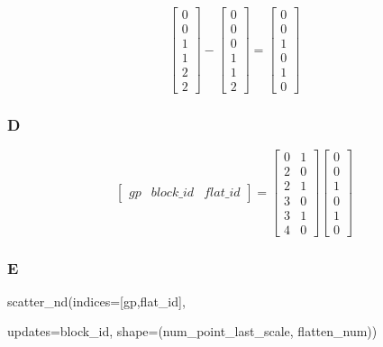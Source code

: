 \documentclass[,table,dvipsnames]{article}
\begin{document}
\[ 
\begin{bmatrix}
0 \\ 0 \\ 1 \\ 1 \\ 2 \\ 2 
\end{bmatrix}
-
\begin{bmatrix}
0 \\ 0 \\ 0 \\ 1 \\ 1 \\2 
\end{bmatrix}
=
\begin{bmatrix}
0 \\ 0 \\ 1 \\ 0 \\ 1 \\0
\end{bmatrix}
\]

\subsubsection{D}
\[ 
\begin{bmatrix}
gp & block\_id & flat\_id
\end{bmatrix}
=
\begin{bmatrix}
	0 & 1 \\ 2 & 0 \\  2 & 1 \\ 3 & 0\\ 3 & 1\\ 4 & 0 
\end{bmatrix} 
\begin{bmatrix}
0 \\ 0 \\ 1 \\ 0 \\ 1 \\0
\end{bmatrix}
\]

\subsubsection{E}
scatter\_nd(indices=[gp,flat\_id], \par updates=block\_id, shape=(num\_point\_last\_scale, flatten\_num))
\end{document}
